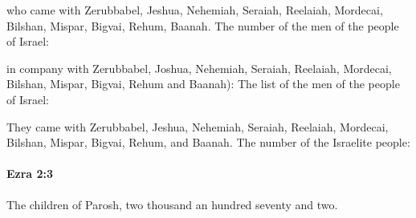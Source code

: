			\begin{versebox}
					\item[BHS] 
					\item[LXX] 
					\item[ASV] who came with Zerubbabel, Jeshua, Nehemiah, Seraiah, Reelaiah, Mordecai, Bilshan, Mispar, Bigvai, Rehum, Baanah. The number of the men of the people of Israel:
					\item[NIV] in company with Zerubbabel, Joshua, Nehemiah, Seraiah, Reelaiah, Mordecai, Bilshan, Mispar, Bigvai, Rehum and Baanah): The list of the men of the people of Israel:
					\item[NRSV] They came with Zerubbabel, Jeshua, Nehemiah, Seraiah, Reelaiah, Mordecai, Bilshan, Mispar, Bigvai, Rehum, and Baanah. The number of the Israelite people:
			\end{versebox}

		\paragraph{Ezra 2:3} %
			\label{EZRA-2-3}

			The children of Parosh, two thousand an hundred seventy and two.

